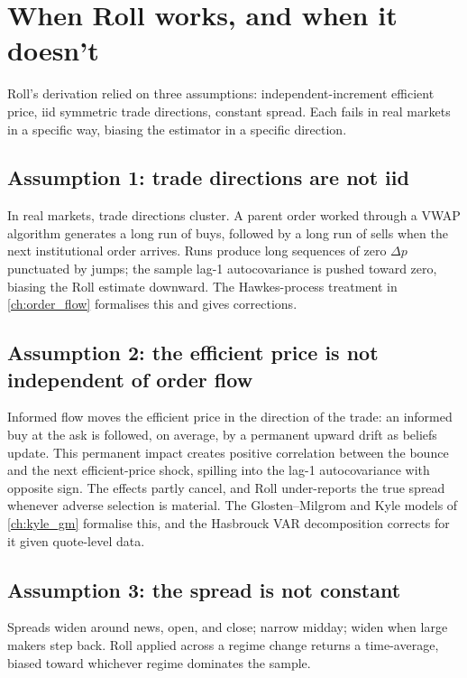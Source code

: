 \section{When Roll works, and when it doesn't}
\label{sec:roll_when_fails}

Roll's derivation relied on three assumptions: independent-increment
efficient price, iid symmetric trade directions, constant spread.
Each fails in real markets in a specific way, biasing the estimator
in a specific direction.

\subsection{Assumption 1: trade directions are not iid}

In real markets, trade directions cluster. A parent order worked
through a VWAP algorithm generates a long run of buys, followed by
a long run of sells when the next institutional order arrives.
Runs produce long sequences of zero $\Delta p$ punctuated by
jumps; the sample lag-1 autocovariance is pushed toward zero,
biasing the Roll estimate downward. The Hawkes-process treatment
in \cref{ch:order_flow} formalises this and gives corrections.

\subsection{Assumption 2: the efficient price is not
independent of order flow}

Informed flow moves the efficient price in the direction of the
trade: an informed buy at the ask is followed, on average, by a
permanent upward drift as beliefs update. This permanent impact
creates positive correlation between the bounce and the next
efficient-price shock, spilling into the lag-1 autocovariance with
opposite sign. The effects partly cancel, and Roll under-reports
the true spread whenever adverse selection is material. The
Glosten--Milgrom and Kyle models of \cref{ch:kyle_gm} formalise
this, and the Hasbrouck VAR decomposition corrects for it given
quote-level data.

\subsection{Assumption 3: the spread is not constant}

Spreads widen around news, open, and close; narrow midday; widen
when large makers step back. Roll applied across a regime change
returns a time-average, biased toward whichever regime dominates
the sample.

